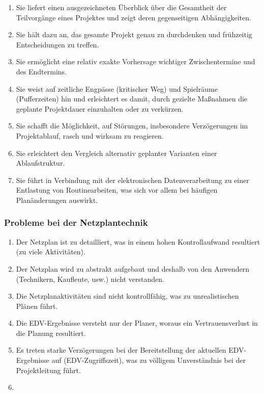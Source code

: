 \documentclass[11pt,a4paper]{article}
\begin{document}
\begin{enumerate}
	\item Sie liefert einen ausgezeichneten Überblick über die Gesamtheit der Teilvorgänge
eines Projektes und zeigt deren gegenseitigen Abhängigkeiten.
	\item Sie hält dazu an, das gesamte Projekt genau zu durchdenken und frühzeitig
Entscheidungen zu treffen.
	\item Sie ermöglicht eine relativ exakte Vorhersage wichtiger Zwischentermine und des
Endtermins.
	\item Sie weist auf zeitliche Engpässe (kritischer Weg) und Spielräume (Pufferzeiten) hin
und erleichtert es damit, durch gezielte Maßnahmen die geplante Projektdauer
einzuhalten oder zu verkürzen.
	\item Sie schafft die Möglichkeit, auf Störungen, insbesondere Verzögerungen im
Projektablauf, rasch und wirksam zu reagieren.
	\item Sie erleichtert den Vergleich alternativ geplanter Varianten einer Ablaufstruktur.
	\item Sie führt in Verbindung mit der elektronischen Datenverarbeitung zu einer Entlastung
von Routinearbeiten, was sich vor allem bei häufigen Planänderungen auswirkt.

\end{enumerate}

\subsubsection{Probleme bei der Netzplantechnik}

\begin{enumerate}
	\item Der Netzplan ist zu detailliert, was in einem hohen Kontrollaufwand resultiert (zu viele
Aktivitäten).
	\item Der Netzplan wird zu abstrakt aufgebaut und deshalb von den Anwendern (Technikern,
Kaufleute, usw.) nicht verstanden.
	\item Die Netzplanaktivitäten sind nicht kontrollfähig, was zu unrealistischen Plänen führt.
	\item Die EDV-Ergebnisse versteht nur der Planer, woraus ein Vertrauensverlust in die Planung
resultiert.
	\item Es treten starke Verzögerungen bei der Bereitstellung der aktuellen EDV-Ergebnisse auf
(EDV-Zugriffszeit), was zu völligem Unverständnis bei der Projektleitung führt.
	\item 
\end{enumerate}
\end{document}
